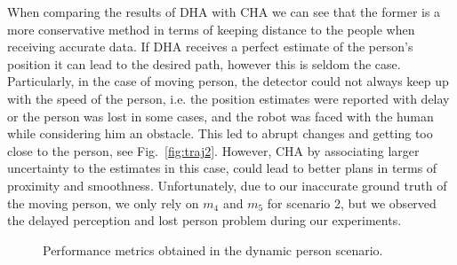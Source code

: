 When comparing the results of DHA with CHA we can see that the former is a more conservative method in terms of keeping distance to the people when receiving accurate data. If DHA receives a perfect estimate of the person's position it can lead to the desired path, however this is seldom the case. Particularly, in the case of moving person, the detector could not always keep up with the speed of the person, i.e. the position estimates were reported with delay or the person was lost in some cases, and the robot was faced with the human while considering him an obstacle. This led to abrupt changes and getting too close to the person, see Fig.~\ref{fig:traj2}. However, CHA by associating larger uncertainty to the estimates in this case, could lead to better plans in terms of proximity and smoothness. Unfortunately, due to our inaccurate ground truth of the moving person, we only rely on $m_{4}$ and $m_{5}$ for scenario 2, but we observed the delayed perception and lost person problem during our experiments. 




\begin{figure}[!]
\centering
{}%
\hspace{0.1cm}
%

\caption{Performance metrics obtained in the dynamic person scenario. %
}
\label{fig:boxplots_singlePersonMov}
\end{figure}

